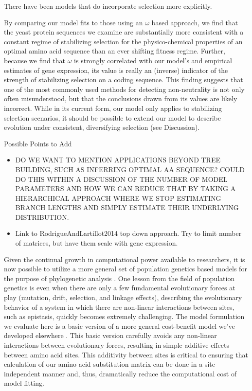 \documentclass[12pt,letterpaper,fleqn]{article}
\begin{document}
{There have been models that do incorporate selection more explicitly.


By comparing our model fits to those using an $\omega$ based approach, we find that the yeast protein sequences we examine are substantially more consistent with a constant regime of stabilizing selection for the physico-chemical properties of an optimal amino acid sequence than an ever shifting fitness regime.
Further, because we find that $\omega$ is strongly correlated with our model's and empirical estimates of  gene expression, its value is really an (inverse) indicator of the strength of stabilizing selection on a coding sequence.
This finding suggests that one of the most commonly used methods for detecting non-neutrality is not only often misunderstood, but that the conclusions drawn from its values are likely incorrect.
While in its current form, our model only applies to stabilizing selection scenarios, it should be possible to extend our model to describe evolution under consistent, diversifying selection (see Discussion). %


Possible Points to Add
\begin{itemize}
    \item DO WE WANT TO MENTION APPLICATIONS BEYOND TREE BUILDING, SUCH AS INFERRING OPTIMAL AA SEQUENCE?
    COULD DO THIS WITHIN A DISCUSSION OF THE NUMBER OF MODEL PARAMETERS AND HOW WE CAN REDUCE THAT BY TAKING A HIERARCHICAL APPROACH WHERE WE STOP ESTIMATING BRANCH LENGTHS AND SIMPLY ESTIMATE THEIR UNDERLYING DISTRIBUTION.
\item Link to RodrigueAndLartillot2014 top down approach.
    Try to limit number of matrices, but have them scale with gene expression.
\end{itemize}
Given the continual growth in computational power available to researchers, it is now possible to utilize a more general set of population genetics based models for the purpose of phylogenetic analysis \citep[e.g.~][]{HalpernAndBruno1998,RobinsonEtAl2003,LartillotAndPhilippe2004,RodrigueAndLartillot2014}.
One lesson from the field of population genetics is even when there are only a few fundamental evolutionary forces at play (mutation, drift, selection, and linkage effects), describing the evolutionary behavior of a system in which there are non-linear interactions between sites, such as epistasis, quickly becomes extremely challenging.
The model formulation we evaluate here is a basic version of a more general cost-benefit model we've developed elsewhere \citep{Gilchrist2007,GilchristEtAl2009,ShahAndGilchrist2011,GilchristEtAl2015}.
This basic version carefully avoids any non-linear interactions between evolutionary forces, resulting in simple additive effects between amino acid sites.
This additivity between sites is critical to ensuring that calculation of our amino acid substitution matrix can be done in a site independent manner and, thus, dramatically reduce the computational cost of model fitting.

}
\end{document}
